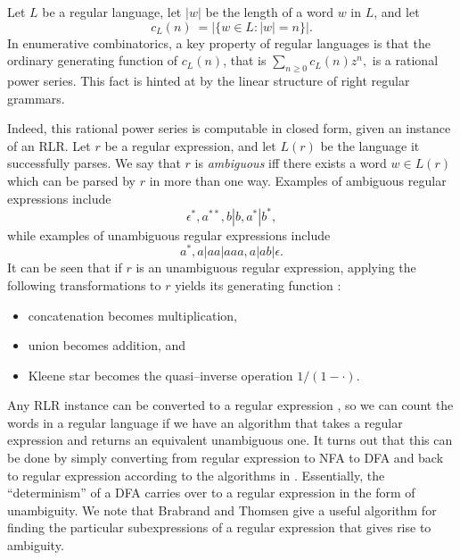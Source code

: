 \documentclass{article}
\theoremstyle{plain}
\begin{document}
Let \( L \) be a regular language, let \( |w| \) be the length of a word
\( w \) in \( L \), and let
\[ c_L(n)\ = \left| \{ w \in L : |w|=n \} \right|. \]
In enumerative combinatorics, a key property of regular languages is that
the ordinary generating function of \( c_L(n) \), that is \( \sum_{n \geq 0}
c_L(n) z^n, \) is a rational power series.
This fact is hinted at by the linear structure of right regular grammars.

Indeed, this rational power series is computable in closed form, given an
instance of an RLR.
Let \( r \) be a regular expression, and let \( L(r) \) be the language it
successfully parses.
We say that \( r \) is \emph{ambiguous} iff there exists a word \( w \in L(r)
\) which can be parsed by \( r \) in more than one way.
Examples of ambiguous regular expressions include
\[ \epsilon^*, a^{**}, b|b, a^*|b^*, \]
while examples of unambiguous regular expressions include
\[ a^*, a|aa|aaa, a|ab|\epsilon. \]
It can be seen that if \( r \) is an unambiguous regular expression,
applying the following transformations to \( r \) yields its generating
function \cite{flaj}:
\begin{itemize}
  \item concatenation becomes multiplication,
  \item union becomes addition, and
  \item Kleene star becomes the quasi--inverse operation \( 1 / (1 - \cdot ) \).
\end{itemize}
Any RLR instance can be converted to a regular expression \cite{sipser}, so we
can count the words in a regular language if we have an algorithm that takes a
regular expression and returns an equivalent unambiguous one.
It turns out that this can be done by simply converting from regular expression
to NFA to DFA and back to regular expression according to the algorithms in
\cite{sipser}.
Essentially, the ``determinism'' of a DFA carries over to a regular
expression in the form of unambiguity.
We note that Brabrand and Thomsen \cite{brabrandthomsen} give a useful algorithm
for finding the particular subexpressions of a regular expression that gives
rise to ambiguity.
\end{document}
